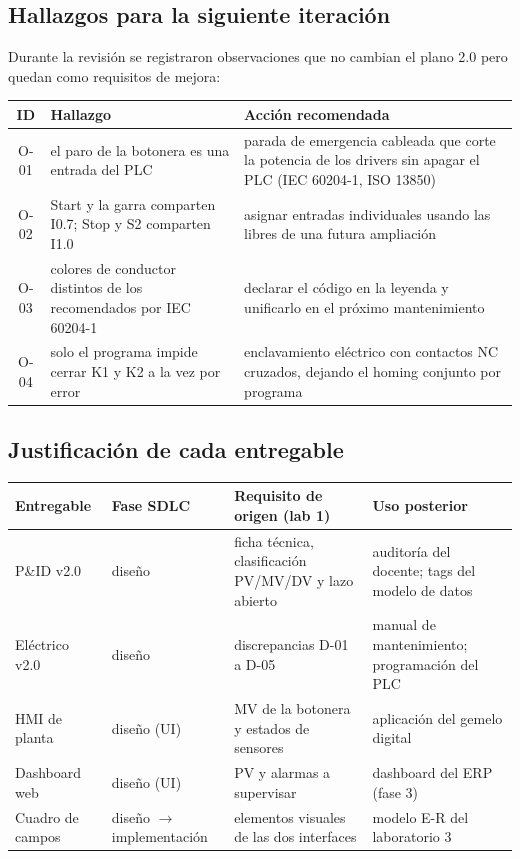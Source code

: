 \documentclass[a4paper,11pt]{article}
\begin{document}
\subsection{Hallazgos para la siguiente iteración}\label{sec:hallazgos}
Durante la revisión se registraron observaciones que no cambian el plano 2.0 pero quedan como requisitos de mejora:
\begin{center}\small
\begin{tabularx}{\linewidth}{c >{\raggedright}X >{\raggedright\arraybackslash}X}
\toprule
\textbf{ID} & \textbf{Hallazgo} & \textbf{Acción recomendada}\\
\midrule
O-01 & el paro de la botonera es una entrada del PLC & parada de emergencia cableada que corte la potencia de los drivers sin apagar el PLC (IEC 60204-1, ISO 13850)\\
O-02 & Start y la garra comparten I0.7; Stop y S2 comparten I1.0 & asignar entradas individuales usando las libres de una futura ampliación\\
O-03 & colores de conductor distintos de los recomendados por IEC 60204-1 & declarar el código en la leyenda y unificarlo en el próximo mantenimiento\\
O-04 & solo el programa impide cerrar K1 y K2 a la vez por error & enclavamiento eléctrico con contactos NC cruzados, dejando el homing conjunto por programa\\
\bottomrule
\end{tabularx}\end{center}

\subsection{Justificación de cada entregable}
\begin{center}\small
\begin{tabularx}{\linewidth}{>{\raggedright}p{3cm} >{\raggedright}p{2cm} >{\raggedright}X >{\raggedright\arraybackslash}X}
\toprule
\textbf{Entregable} & \textbf{Fase SDLC} & \textbf{Requisito de origen (lab 1)} & \textbf{Uso posterior}\\
\midrule
P\&ID v2.0 & diseño & ficha técnica, clasificación PV/MV/DV y lazo abierto & auditoría del docente; tags del modelo de datos\\
Eléctrico v2.0 & diseño & discrepancias D-01 a D-05 & manual de mantenimiento; programación del PLC\\
HMI de planta & diseño (UI) & MV de la botonera y estados de sensores & aplicación del gemelo digital\\
Dashboard web & diseño (UI) & PV y alarmas a supervisar & dashboard del ERP (fase 3)\\
Cuadro de campos & diseño $\rightarrow$ implementación & elementos visuales de las dos interfaces & modelo E-R del laboratorio 3\\
\bottomrule
\end{tabularx}\end{center}
\end{document}
